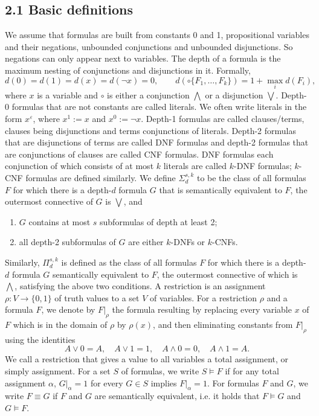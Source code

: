 \documentclass[10pt,a4paper]{article}
\newcommand{\bits}{\{0,1\}}
\begin{document}
\subsection*{2.1 Basic definitions}
We assume that formulas are built from constants 0 and 1, propositional variables and their negations, unbounded conjunctions and unbounded disjunctions. So negations can only appear next to variables. The depth of a formula is the maximum nesting of conjunctions and disjunctions in it. Formally,
\[d(0)=d(1)=d(x)=d(\neg x)=0,\qquad d(\circ\{F_1,\ldots,F_k\})=1+\max_i d(F_i),\]
where $x$ is a variable and $\circ$ is either a conjunction $\bigwedge$ or a disjunction $\bigvee$.
Depth-0 formulas that are not constants are called literals. We often write literals in the form $x^\varepsilon$, where $x^1:=x$ and $x^0:=\neg x$. Depth-1 formulas are called clauses/terms, clauses being disjunctions and terms conjunctions of literals. Depth-2 formulas that are disjunctions of terms are called DNF formulas and depth-2 formulas that are conjunctions of clauses are called CNF formulas. DNF formulas each conjunction of which consists of at most $k$ literals are called $k$-DNF formulas; $k$-CNF formulas are defined similarly. We define $\Sigma_d^{s,k}$ to be the class of all formulas $F$ for which there is a depth-$d$ formula $G$ that is semantically equivalent to $F$, the outermost connective of $G$ is $\bigvee$, and
\begin{enumerate}\item $G$ contains at most $s$ subformulas of depth at least 2;\item all depth-2 subformulas of $G$ are either $k$-DNFs or $k$-CNFs.\end{enumerate}
Similarly, $\Pi_d^{s,k}$ is defined as the class of all formulas $F$ for which there is a depth-$d$ formula $G$ semantically equivalent to $F$, the outermost connective of which is $\bigwedge$, satisfying the above two conditions.
A restriction is an assignment $\rho:V\to\bits$ of truth values to a set $V$ of variables. For a restriction $\rho$ and a formula $F$, we denote by $F|_\rho$ the formula resulting by replacing every variable $x$ of $F$ which is in the domain of $\rho$ by $\rho(x)$, and then eliminating constants from $F|_\rho$ using the identities
\[A\vee0=A,\quad A\vee1=1,\quad A\wedge0=0,\quad A\wedge1=A.\]
We call a restriction that gives a value to all variables a total assignment, or simply assignment. For a set $S$ of formulas, we write $S\models F$ if for any total assignment $\alpha$, $G|_\alpha=1$ for every $G\in S$ implies $F|_\alpha=1$. For formulas $F$ and $G$, we write $F\equiv G$ if $F$ and $G$ are semantically equivalent, i.e. it holds that $F\models G$ and $G\models F$.
\end{document}
